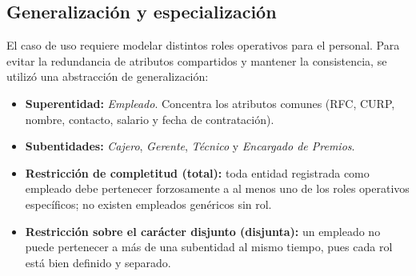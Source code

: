 \documentclass[11pt,letterpaper,spanish]{article}
\newcommand{\marcaOriginal}{}
\begin{document}
\subsection*{Generalización y especialización \marcaOriginal}

El caso de uso requiere modelar distintos roles operativos para el personal. Para evitar la
redundancia de atributos compartidos y mantener la consistencia, se utilizó una abstracción
de generalización:

\begin{itemize}
	\item \textbf{Superentidad:} \emph{Empleado}. Concentra los atributos comunes (RFC,
	      CURP, nombre, contacto, salario y fecha de contratación).
	\item \textbf{Subentidades:} \emph{Cajero}, \emph{Gerente}, \emph{Técnico} y
	      \emph{Encargado de Premios}.
	\item \textbf{Restricción de completitud (total):} toda entidad registrada como empleado
	      debe pertenecer forzosamente a al menos uno de los roles operativos específicos;
	      no existen empleados genéricos sin rol.
	\item \textbf{Restricción sobre el carácter disjunto (disjunta):} un empleado no puede
	      pertenecer a más de una subentidad al mismo tiempo, pues cada rol está bien
	      definido y separado.
\end{itemize}
\end{document}
